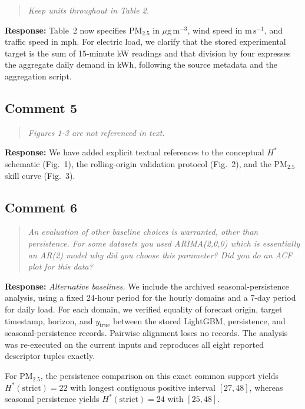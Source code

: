 \documentclass[11pt,a4paper]{article}
\let\originalsubsection\subsection
\renewcommand{\subsection}{\Needspace{9\baselineskip}\originalsubsection}
\newenvironment{reviewcomment}
  {\begin{quote}\itshape}
  {\end{quote}}
\newcommand{\response}{\noindent\textbf{Response:} }
\begin{document}
\begin{reviewcomment}
Keep units throughout in Table 2.
\end{reviewcomment}

\response
Table~2 now specifies PM$_{2.5}$ in $\mu\mathrm{g\,m^{-3}}$, wind speed in
$\mathrm{m\,s^{-1}}$, and traffic speed in mph. For electric load, we clarify that the
stored experimental target is the sum of 15-minute kW readings and that
division by four expresses the aggregate daily demand in kWh, following the source
metadata and the aggregation script.


\subsection*{Comment 5}

\begin{reviewcomment}
Figures 1-3 are not referenced in text.
\end{reviewcomment}

\response
We have added explicit textual references to the conceptual $H^*$ schematic
(Fig.~1), the rolling-origin validation protocol (Fig.~2), and the
PM$_{2.5}$ skill curve (Fig.~3).


\subsection*{Comment 6}

\begin{reviewcomment}
An evaluation of other baseline choices is warranted, other than persistence. For some datasets you used ARIMA(2,0,0) which is essentially an AR(2) model why did you choose this parameter? Did you do an ACF plot for this data?
\end{reviewcomment}

\response
\textit{Alternative baselines.} We include the archived seasonal-persistence analysis, using a fixed
24-hour period for the hourly domains and a 7-day period for daily load.
For each domain, we verified equality of forecast origin, target timestamp,
horizon, and $y_{\mathrm{true}}$ between the stored LightGBM, persistence,
and seasonal-persistence records. Pairwise alignment loses no records.
The analysis was re-executed on the current inputs and reproduces all eight
reported descriptor tuples exactly.

For PM$_{2.5}$, the persistence comparison on this exact common support yields
$H^*(\mathrm{strict})=22$ with longest contiguous positive interval $[27,48]$,
whereas seasonal persistence yields $H^*(\mathrm{strict})=24$ with $[25,48]$.
\end{document}
